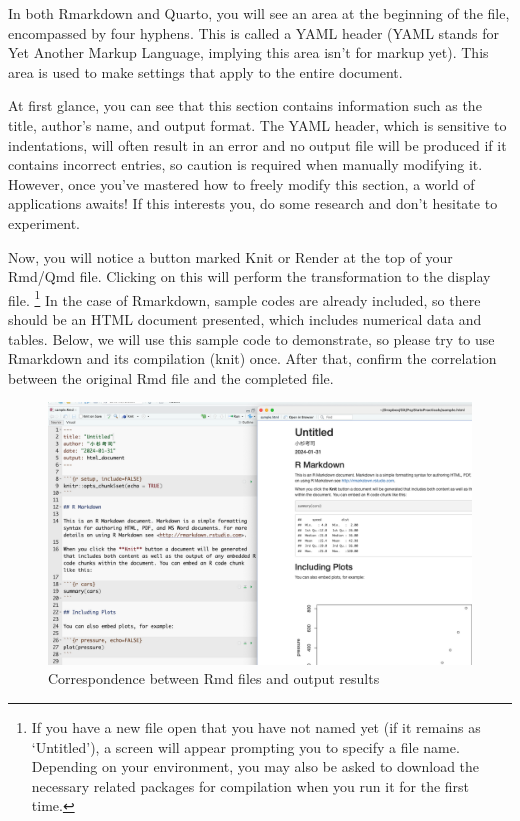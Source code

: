 \documentclass[
  a4paper,
]{book}
\begin{document}
In both Rmarkdown and Quarto, you will see an area at the beginning of
the file, encompassed by four hyphens. This is called a YAML header
(YAML stands for Yet Another Markup Language, implying this area isn't
for markup yet). This area is used to make settings that apply to the
entire document.

At first glance, you can see that this section contains information such
as the title, author's name, and output format. The YAML header, which
is sensitive to indentations, will often result in an error and no
output file will be produced if it contains incorrect entries, so
caution is required when manually modifying it. However, once you've
mastered how to freely modify this section, a world of applications
awaits! If this interests you, do some research and don't hesitate to
experiment.

Now, you will notice a button marked Knit or Render at the top of your
Rmd/Qmd file. Clicking on this will perform the transformation to the
display file. \footnote{If you have a new file open that you have not
  named yet (if it remains as `Untitled'), a screen will appear
  prompting you to specify a file name. Depending on your environment,
  you may also be asked to download the necessary related packages for
  compilation when you run it for the first time.} In the case of
Rmarkdown, sample codes are already included, so there should be an HTML
document presented, which includes numerical data and tables. Below, we
will use this sample code to demonstrate, so please try to use Rmarkdown
and its compilation (knit) once. After that, confirm the correlation
between the original Rmd file and the completed file.

\begin{figure}[H]

{\centering \includegraphics{../common/images/04_coresspRmd.png}

}

\caption{Correspondence between Rmd files and output results}

\end{figure}%
\end{document}
